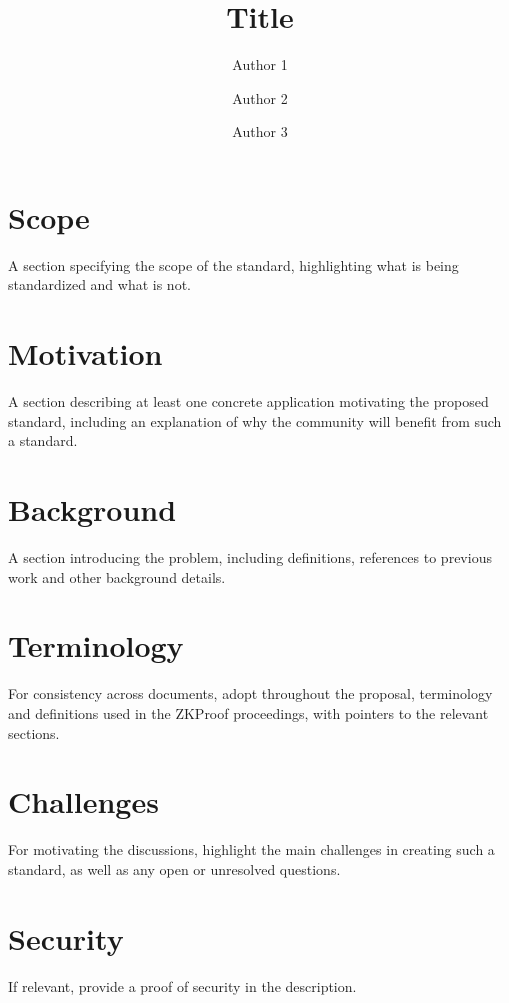 \documentclass{article}
\title{ Title \vspace{-0.2cm} }
\author[1]{Author 1}
\author[2]{Author 2}
\author[1]{Author 3}
\affil[1]{Affiliation 1}
\affil[2]{Affiliation 2}
\date{} %
\begin{document}
\maketitle 
\vspace{1cm}
\tableofcontents

\vspace{0.5cm}


\section{Scope}						%
	A section specifying the scope of the standard, highlighting what is being standardized and what is not.
	
\section{Motivation}				%
	A section describing at least one concrete application motivating the proposed standard, including an explanation of why the community will benefit from such a standard.
	
\section{Background}				%
	A section introducing the problem, including definitions, references to previous work and other background details.
	
\section{Terminology}				%
	For consistency across documents, adopt throughout the proposal, terminology and definitions used in the ZKProof proceedings, with pointers to the relevant sections.
	
\section{Challenges}				%
	For motivating the discussions, highlight the main challenges in creating such a standard, as well as any open or unresolved questions.
	
\section{Security}					%
	If relevant, provide a proof of security in the description.
	
\end{document}
